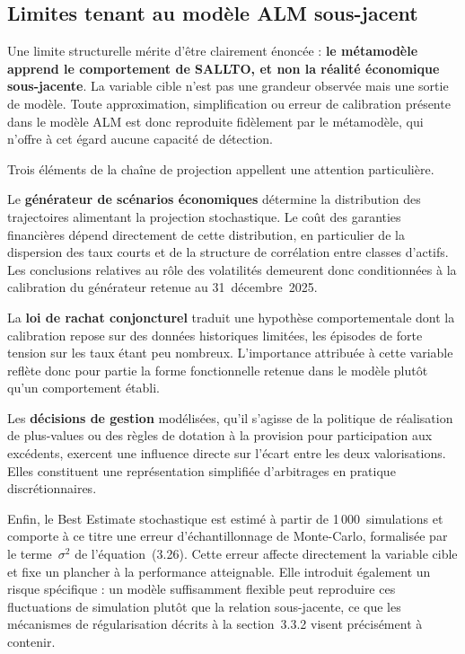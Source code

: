 \subsection{Limites tenant au modèle ALM sous-jacent}

Une limite structurelle mérite d'être clairement énoncée : \textbf{le métamodèle apprend le comportement de SALLTO, et non la réalité économique sous-jacente}. La variable cible n'est pas une grandeur observée mais une sortie de modèle. Toute approximation, simplification ou erreur de calibration présente dans le modèle ALM est donc reproduite fidèlement par le métamodèle, qui n'offre à cet égard aucune capacité de détection.

Trois éléments de la chaîne de projection appellent une attention particulière.

Le \textbf{générateur de scénarios économiques} détermine la distribution des trajectoires alimentant la projection stochastique. Le coût des garanties financières dépend directement de cette distribution, en particulier de la dispersion des taux courts et de la structure de corrélation entre classes d'actifs. Les conclusions relatives au rôle des volatilités demeurent donc conditionnées à la calibration du générateur retenue au 31~décembre~2025.

La \textbf{loi de rachat conjoncturel} traduit une hypothèse comportementale dont la calibration repose sur des données historiques limitées, les épisodes de forte tension sur les taux étant peu nombreux. L'importance attribuée à cette variable reflète donc pour partie la forme fonctionnelle retenue dans le modèle plutôt qu'un comportement établi.

Les \textbf{décisions de gestion} modélisées, qu'il s'agisse de la politique de réalisation de plus-values ou des règles de dotation à la provision pour participation aux excédents, exercent une influence directe sur l'écart entre les deux valorisations. Elles constituent une représentation simplifiée d'arbitrages en pratique discrétionnaires.

Enfin, le Best Estimate stochastique est estimé à partir de 1\,000~simulations et comporte à ce titre une erreur d'échantillonnage de Monte-Carlo, formalisée par le terme~\(\sigma^2\) de l'équation~(3.26). Cette erreur affecte directement la variable cible et fixe un plancher à la performance atteignable. Elle introduit également un risque spécifique : un modèle suffisamment flexible peut reproduire ces fluctuations de simulation plutôt que la relation sous-jacente, ce que les mécanismes de régularisation décrits à la section~3.3.2 visent précisément à contenir.

